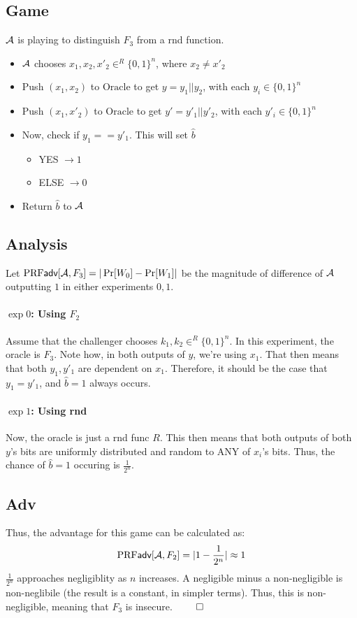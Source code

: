 \documentclass[12pt]{article}
\begin{document}
\begin{problem}
\begin{solution}
\subsection*{Game}
$\mathcal{A}$ is playing to distinguish $F_3$ from a rnd function.
\begin{itemize}
  \item $\mathcal{A}$ chooses $x_1, x_2, x'_2 \in^R \{0, 1\}^n$, where $x_2 \neq x'_2$
  \item Push $(x_1, x_2)$ to $\text{Oracle}$ to get $y = y_1 || y_2$, with each $y_i \in \{0, 1\}^{n}$
  \item Push $(x_1, x'_2)$ to $\text{Oracle}$ to get $y' = y'_1 || y'_2$, with each $y'_i \in \{0, 1\}^{n}$
  \item Now, check if $y_1 == y'_1$. This will set $\hat{b}$
  \begin{itemize}
    \item YES $\to 1$
    \item ELSE $\to 0$
  \end{itemize}
  \item Return $\hat{b}$ to $\mathcal{A}$
\end{itemize}

\subsection*{Analysis}
Let $\textrm{PRF}\textsf{adv}[\mathcal{A}, F_3] = |\Pr[W_0] - \Pr[W_1]|$ be the magnitude of difference of $\mathcal{A}$ outputting $1$ in either experiments $0, 1$.

\paragraph{$\exp 0$: Using $F_2$}
Assume that the challenger chooses $k_1, k_2 \in^R \{0, 1\}^n$. In this experiment, the oracle is $F_3$. Note how, in both outputs of $y$, we're using $x_1$. That then means that both $y_1, y'_1$ are dependent on $x_1$. Therefore, it should be the case that $y_1 = y'_1$, and $\hat{b} = 1$ always occurs.

\paragraph{$\exp 1$: Using rnd}
Now, the oracle is just a rnd func $R$. This then means that both outputs of both $y$'s bits are uniformly distributed and random to ANY of $x_i$'s bits. Thus, the chance of $\hat{b} = 1$ occuring is $\frac{1}{2^n}$.

\subsection*{Adv}
Thus, the advantage for this game can be calculated as:
\begin{equation*}
  \textrm{PRF}\textsf{adv}[\mathcal{A}, F_2] = |1 - \frac{1}{2^n}| \approx 1
\end{equation*}
$\frac{1}{2^n}$ approaches negligiblity as $n$ increases. A negligible minus a non-negligible is non-neglibile (the result is a constant, in simpler terms). Thus, this is non-negligible, meaning that $F_3$ is insecure. $\qed$
\end{solution}



\end{problem}
\end{document}
